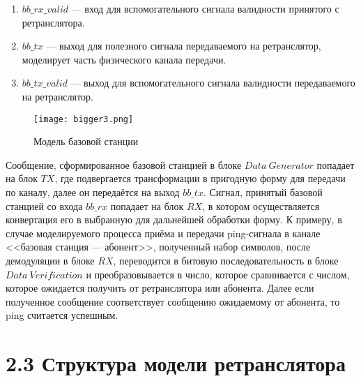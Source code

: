 \begin{onehalfspace}
\begin{enumerate}
            \item $bb\_rx\_valid$ — вход для вспомогательного сигнала валидности принятого с ретранслятора.

            \item $bb\_tx$ — выход для полезного сигнала передаваемого на ретранслятор, моделирует часть физического канала передачи.
  
            \item $bb\_tx\_valid$ — выход для вспомогательного сигнала валидности передаваемого на ретранслятор.
\end{enumerate}


\begin{center}
		\begin{figure}[h!]
			\centering
			\texttt{[image: bigger3.png]}
			\caption{Модель базовой станции}
			\label{fig:model12}
		\end{figure}
	\end{center}

Сообщение, сформированное базовой станцией в блоке $Data \ Generator$ попадает на блок $TX$, где подвергается трансформации в пригодную форму для передачи по каналу, далее он передаётся на выход $bb\_tx$. Сигнал, принятый базовой станцией со входа $bb\_rx$ попадает на блок $RX$, в котором осуществляется конвертация его в выбранную для дальнейшей обработки форму. К примеру, в случае моделируемого процесса приёма и передачи ping-сигнала в канале <<базовая станция — абонент>>, полученный набор символов, после демодуляции в блоке $RX$, переводится в битовую последовательность в блоке $Data \ Verification$ и преобразовывается в число, которое сравнивается с числом, которое ожидается получить от ретранслятора или абонента. Далее если полученное сообщение соответствует сообщению ожидаемому от абонента, то ping считается успешным.

	
	
\end{onehalfspace}




\section*{\large{2.3 Структура модели ретранслятора}}
 
